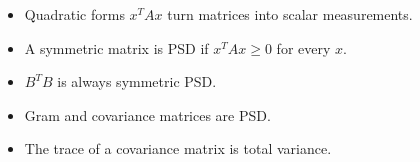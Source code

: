 \begin{itemize}
  \item Quadratic forms $x^TAx$ turn matrices into scalar measurements.
  \item A symmetric matrix is PSD if $x^TAx\geq 0$ for every $x$.
  \item $B^TB$ is always symmetric PSD.
  \item Gram and covariance matrices are PSD.
  \item The trace of a covariance matrix is total variance.
\end{itemize}


